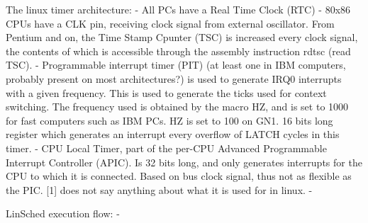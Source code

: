The linux timer architecture:
- All PCs have a Real Time Clock (RTC)
- 80x86 CPUs have a CLK pin, receiving clock signal from external oscillator. From Pentium and on, the Time Stamp Cpunter (TSC) is increased every clock signal, the contents of which is accessible through the assembly instruction rdtsc (read TSC).
- Programmable interrupt timer (PIT) (at least one in IBM computers, probably present on most architectures?) is used to generate IRQ0 interrupts with a given frequency. This is used to generate the ticks used for context switching. The frequency used is obtained by the macro HZ, and is set to 1000 for fast computers such as IBM PCs. HZ is set to 100 on GN1. 16 bits long register which generates an interrupt every overflow of LATCH cycles in this timer.
- CPU Local Timer, part of the per-CPU Advanced Programmable Interrupt Controller (APIC). Is 32 bits long, and only generates interrupts for the CPU to which it is connected. Based on bus clock signal, thus not as flexible as the PIC. [1] does not say anything about what it is used for in linux.
- 

LinSched execution flow:
- 